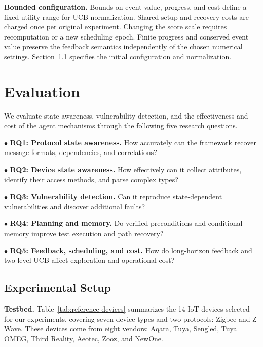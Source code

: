 \documentclass[10pt,journal,compsoc]{IEEEtran}
\DeclareRobustCommand{\rq}[1]{\textcolor{rqcolor}{\textbf{RQ#1}}}
\newcommand{\parab}[1]{\vspace{0.04in}\noindent\textbf{#1}}
\begin{document}
\parab{Bounded configuration.}
Bounds on event value, progress, and cost define a fixed utility range for UCB normalization. Shared setup and recovery costs are charged once per original experiment. Changing the score scale requires recomputation or a new scheduling epoch. Finite progress and conserved event value preserve the feedback semantics independently of the chosen numerical settings. Section~\ref{sec:setup} specifies the initial configuration and normalization.

\section{Evaluation}\label{sec:evaluation}
We evaluate state awareness, vulnerability detection, and the effectiveness and cost of the agent mechanisms through the following five research questions.\label{sec:rq}

\noindent $\bullet$ \textbf{\rq{1}: Protocol state awareness.} How accurately can the framework recover message formats, dependencies, and correlations?

\noindent $\bullet$ \textbf{\rq{2}: Device state awareness.} How effectively can it collect attributes, identify their access methods, and parse complex types?

\noindent $\bullet$ \textbf{\rq{3}: Vulnerability detection.} Can it reproduce state-dependent vulnerabilities and discover additional faults?

\noindent $\bullet$ \textbf{\rq{4}: Planning and memory.} Do verified preconditions and conditional memory improve test execution and path recovery?

\noindent $\bullet$ \textbf{\rq{5}: Feedback, scheduling, and cost.} How do long-horizon feedback and two-level UCB affect exploration and operational cost?

\subsection{Experimental Setup}\label{sec:setup}
\parab{Testbed.}
Table~\ref{tab:reference-devices} summarizes the 14 IoT devices selected for our experiments, covering seven device types and two protocols: Zigbee and Z-Wave. These devices come from eight vendors: Aqara, Tuya, Sengled, Tuya OMEG, Third Reality, Aeotec, Zooz, and NewOne.
\end{document}
